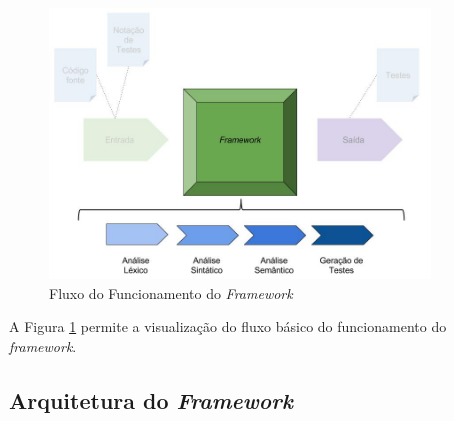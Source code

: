  \begin{figure}[h]
    \centering
    \includegraphics[width=0.9\textwidth]{figuras/Framework-interior.jpg}
    \caption{Fluxo do Funcionamento do \textit{Framework}}
    \label{fig:Framework-interior}
 \end{figure}
 
 \par
 \indent A Figura \ref{fig:Framework-interior} permite a visualização do fluxo básico do funcionamento do \textit{framework}.  


\subsection{Arquitetura do \textit{Framework}}



